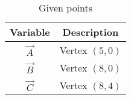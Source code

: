 \begin{table}[h!]
\centering
\begin{tabular}{|c|c|}
\hline
\textbf{Variable} & \textbf{Description} \\
\hline
$\vec{A}$ & Vertex $(5,0)$ \\
$\vec{B}$ & Vertex $(8,0)$ \\
$\vec{C}$ & Vertex $(8,4)$ \\
\hline
\end{tabular}
\caption{Given points}
\label{tab:2.7.22}
\end{table}